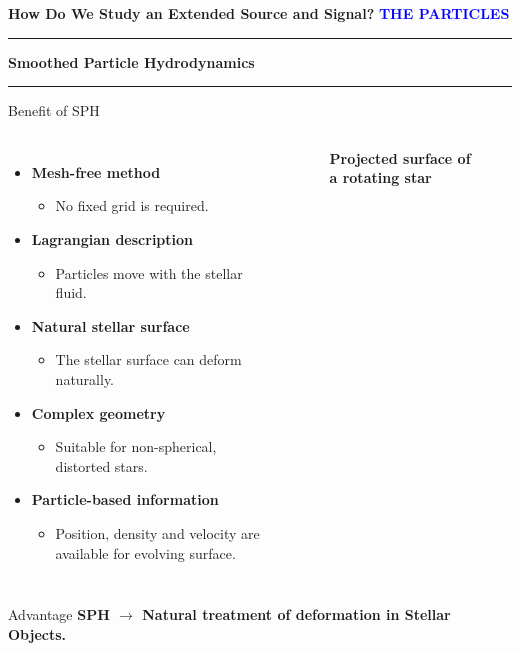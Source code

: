 \documentclass{beamer}
\begin{document}
    \begin{frame}
     	\centering
	    \vfill	
	    {\Large\textbf{How Do We Study an Extended Source and Signal?}}	
	    \textbf{\textcolor{blue}{THE PARTICLES}}	
	    
	    \vspace{0.5cm}	
	    {\color{blue}\rule{0.25\textwidth}{1.5pt}}    
	    \hspace{0.15cm}
	    {\color{red}\textbf{\Large Smoothed Particle Hydrodynamics}}
	    
	    \hspace{0.15cm}
	    {\color{blue}\rule{0.25\textwidth}{1.5pt}}	
    	\vfill
    \end{frame}

    \begin{frame}{Benefit of SPH}   
    	\begin{columns}[c]
    		\begin{itemize}
    			\item \textbf{Mesh-free method}
    			\begin{itemize}
    				\item No fixed grid is required.
    			\end{itemize}    		
    			\item \textbf{Lagrangian description}
    			\begin{itemize}
    				\item Particles move with the stellar fluid.
    			\end{itemize}
    			\item \textbf{Natural stellar surface}
    			\begin{itemize}
    				\item The stellar surface can deform naturally.
    			\end{itemize}
    			\item \textbf{Complex geometry}
    			\begin{itemize}
    				\item Suitable for non-spherical, distorted stars.
    			\end{itemize}
    			\item \textbf{Particle-based information}
    			\begin{itemize}
    				\item Position, density and velocity are available for evolving surface.
    			\end{itemize}
    		\end{itemize}
    	    \begin{figure}
    	    	\centering
    	    	\caption*{\tiny \textbf{Projected surface of a rotating star}}
    	    \end{figure}
    	\end{columns} 	
    	
        \begin{block}{Advantage}
        	\centering
        	\textbf{SPH $\rightarrow$ Natural treatment of deformation in Stellar Objects.}
        \end{block}     	
    \end{frame}
\end{document}
